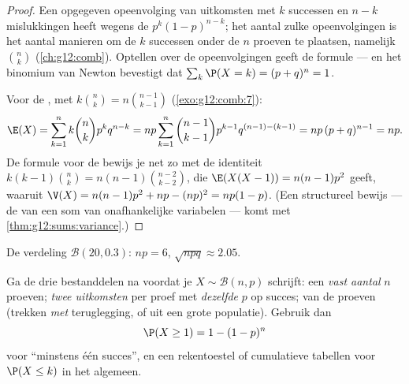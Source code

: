 \begin{proof}
Een opgegeven opeenvolging van uitkomsten met $k$ successen en $n-k$
mislukkingen heeft wegens de   $p^k(1-p)^{n-k}$; het
aantal zulke opeenvolgingen is het aantal manieren om de $k$ successen onder
de $n$ proeven te plaatsen, namelijk $\binom nk$ (\cref{ch:g12:comb}).
Optellen over de opeenvolgingen geeft de formule --- en het binomium van
Newton bevestigt dat $\sum_k \P(X = k) = (p + q)^n = 1$.

Voor de , met $k\binom nk = n\binom{n-1}{k-1}$
(\cref{exo:g12:comb:7}):
\[
\E(X) = \sum_{k=1}^{n} k\binom nk p^k q^{n-k}
= np\sum_{k=1}^{n} \binom{n-1}{k-1} p^{k-1} q^{(n-1)-(k-1)}
= np\,(p + q)^{n-1} = np .
\]
De formule voor de  bewijs je net zo met de identiteit
$k(k-1)\binom nk = n(n-1)\binom{n-2}{k-2}$, die $\E(X(X-1)) = n(n-1)p^2$
geeft, waaruit $\V(X) = n(n-1)p^2 + np - (np)^2 = np(1-p)$. (Een structureel
bewijs --- de  van een som van onafhankelijke variabelen --- komt met
\cref{thm:g12:sums:variance}.)
\end{proof}

\begin{omfigure}

{\small De verdeling $\mathcal B(20, 0.3)$:  $np = 6$,
 $\sqrt{npq} \approx 2.05$.}
\end{omfigure}

\begin{method}\label{met:g12:randvar:recognize}
Ga de drie bestanddelen na voordat je $X \sim \mathcal B(n,p)$ schrijft: een
\emph{vast aantal} $n$ proeven; \emph{twee uitkomsten} per proef met
\emph{dezelfde}  $p$ op succes; \emph{} van de proeven
(trekken \emph{met} teruglegging, of uit een grote populatie). Gebruik dan
\[
\P(X \geq 1) = 1 - (1-p)^n
\]
voor ``minstens één succes'', en een rekentoestel of cumulatieve tabellen voor
$\P(X \leq k)$ in het algemeen.
\end{method}


